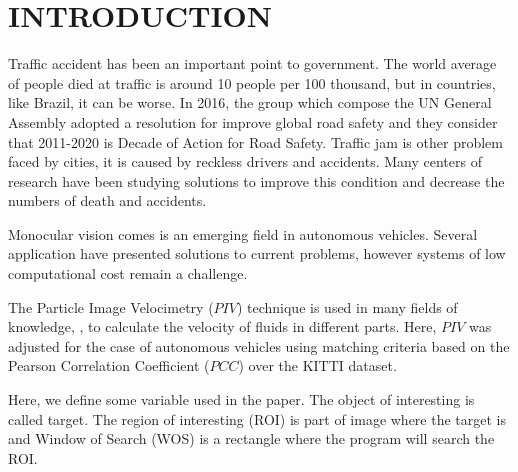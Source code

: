 \section{INTRODUCTION}

Traffic accident has been an important point to government. The world average of people
died at traffic is around 10 people per 100 thousand, but in countries, like Brazil, it can be worse.
In 2016, the group which compose the UN General Assembly adopted a resolution for
improve global road safety and they consider that 2011-2020 is Decade of Action for Road Safety.
Traffic jam is other problem faced by cities, it is caused by reckless drivers and accidents.
Many centers of research have been studying solutions to improve this condition and decrease the 
numbers of death and accidents.

Monocular vision comes is an emerging field in autonomous vehicles. 
Several application have presented solutions to current problems, 
however systems  of low computational cost remain a challenge. 


The Particle Image Velocimetry ($PIV$)\cite{Bastiaans} technique is used in many fields of 
knowledge, \cite{Story, Xu}, to calculate the velocity of fluids in different parts. 
Here, $PIV$ was adjusted for the case of autonomous vehicles using matching criteria based on 
the Pearson Correlation Coefficient ($PCC$)\cite{Miranda Neto} over the KITTI dataset\cite{Geiger}.

Here, we define some variable used in the paper. The object of interesting is called target.
The region of interesting (ROI) is part of image where the target is and
Window of Search (WOS) is a rectangle where the program will search the ROI. 

